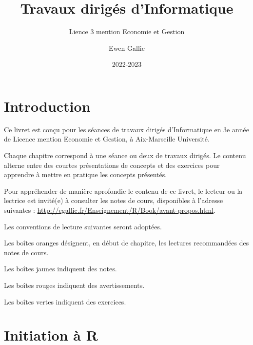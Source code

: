 \documentclass[
  11pt,
]{book}
\title{Travaux dirigés d'Informatique}
\subtitle{Lience 3 mention Economie et Gestion}
\author{Ewen Gallic}
\date{2022-2023}
\numberwithin{equation}{section}
\numberwithin{countremarque}{section}
\newcounter{exercices}[section]
\newenvironment{notebox}{
  \begin{tcolorbox}[breakable, colback=jaune,coltext=black,
                  colframe=grisfonce]}
 {\end{tcolorbox}}
\newenvironment{greenbox}{
  \begin{tcolorbox}[breakable, colback=vert,coltext=black,
                  colframe=grisfonce]}
 {\end{tcolorbox}}
\newenvironment{redbox}{
  \begin{tcolorbox}[breakable, colback=rouge,coltext=white,
                  colframe=grisfonce]}
 {\end{tcolorbox}}
\newenvironment{orangebox}{
  \begin{tcolorbox}[breakable, colback=oran,coltext=white,
                  colframe=grisfonce]}
 {\end{tcolorbox}}
\begin{document}
\maketitle

{
\hypersetup{linkcolor=}
\setcounter{tocdepth}{3}
\tableofcontents
}
\listoftables
\hypertarget{introduction}{%
\chapter*{Introduction}\label{introduction}}

Ce livret est conçu pour les séances de travaux dirigés d'Informatique en 3e année de Licence mention Economie et Gestion, à Aix-Marseille Université.

Chaque chapitre correspond à une séance ou deux de travaux dirigés. Le contenu alterne entre des courtes présentations de concepts et des exercices pour apprendre à mettre en pratique les concepts présentés.

Pour appréhender de manière aprofondie le contenu de ce livret, le lecteur ou la lectrice est invité(e) à consulter les notes de cours, disponibles à l'adresse suivantes : \url{http://egallic.fr/Enseignement/R/Book/avant-propos.html}.

Les conventions de lecture suivantes seront adoptées.

\begin{orangebox}
Les boîtes oranges désignent, en début de chapitre, les lectures recommandées des notes de cours.

\end{orangebox}

\begin{notebox}
Les boîtes jaunes indiquent des notes.

\end{notebox}

\begin{redbox}
Les boîtes rouges indiquent des avertissements.

\end{redbox}

\begin{greenbox}
Les boîtes vertes indiquent des exercices.

\end{greenbox}

\hypertarget{initiation-uxe0-r}{%
\chapter{Initiation à R}\label{initiation-uxe0-r}}
\end{document}
